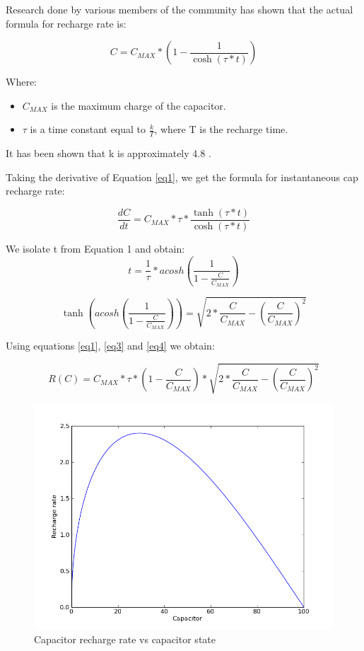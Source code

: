 Research \cite{capresearch} done by various members of the community has shown that the actual formula for recharge rate is:

\begin{equation}
C = C_{MAX} * \left(1-\frac{1}{\cosh (\tau * t)}\right)
\label{eq1}
\end{equation}

Where:
\begin{itemize}
\item $ C_{MAX} $ is the maximum charge of the capacitor.
\item $ \tau $ is a time constant equal to $ \frac{k}{T} $, where T is the recharge time.
\end{itemize}

It has been shown that k is approximately 4.8 \cite{capresearch}.

Taking the derivative of Equation \ref{eq1}, we get the formula for instantaneous cap recharge rate:

\begin{equation}
\frac{dC}{dt} = C_{MAX} * \tau * \frac{\tanh (\tau * t)}{\cosh (\tau * t)}
\label{eq2}
\end{equation}

We isolate t from Equation 1 and obtain:
\begin{equation}
t = \frac{1}{\tau} * acosh \left(\frac{1}{1 - \frac{C}{C_{MAX}}}\right)
\label{eq3}
\end{equation}

\begin{equation}
\tanh \left(acosh \left(\frac{1}{1 - \frac{C}{C_{MAX}}}\right) \right) = \sqrt{2 * \frac{C}{C_{MAX}} - \left(\frac{C}{C_{MAX}}\right) ^ 2}
\label{eq4}
\end{equation}

Using equations \ref{eq1}, \ref{eq3} and \ref{eq4} we obtain:

\begin{equation}
R(C) = C_{MAX} * \tau * \left(1 - \frac{C}{C_{MAX}}\right) * \sqrt{2 * \frac{C}{C_{MAX}} - \left(\frac{C}{C_{MAX}}\right) ^ 2}
\end{equation}

\begin{figure}[h]
\centering
\includegraphics[width=0.7\linewidth]{src/img/ratevscap}
\caption{Capacitor recharge rate vs capacitor state}
\label{fig:ratevscap}
\end{figure}


